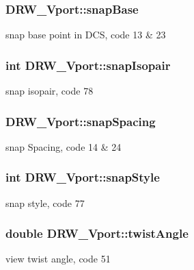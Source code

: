 \subsubsection[{snap\+Base}]{ D\+R\+W\+\_\+\+Vport\+::snap\+Base}\label{class_d_r_w___vport_a152be2cc28b499c29e9302efa54e001c}
snap base point in D\+C\+S, code 13 \& 23 \hypertarget{class_d_r_w___vport_ab69959b8dfaf2ce024b4babee4466445}{}
\subsubsection[{snap\+Isopair}]{\setlength{\rightskip}{0pt plus 5cm}int D\+R\+W\+\_\+\+Vport\+::snap\+Isopair}\label{class_d_r_w___vport_ab69959b8dfaf2ce024b4babee4466445}
snap isopair, code 78 \hypertarget{class_d_r_w___vport_a19aa53d1282cb737b21fa3d3b60d3b20}{}
\subsubsection[{snap\+Spacing}]{ D\+R\+W\+\_\+\+Vport\+::snap\+Spacing}\label{class_d_r_w___vport_a19aa53d1282cb737b21fa3d3b60d3b20}
snap Spacing, code 14 \& 24 \hypertarget{class_d_r_w___vport_a09eede75fea3bb3052edfc9caf5fd380}{}
\subsubsection[{snap\+Style}]{\setlength{\rightskip}{0pt plus 5cm}int D\+R\+W\+\_\+\+Vport\+::snap\+Style}\label{class_d_r_w___vport_a09eede75fea3bb3052edfc9caf5fd380}
snap style, code 77 \hypertarget{class_d_r_w___vport_a2705ee0b61e21b33cad269b71c04b86c}{}
\subsubsection[{twist\+Angle}]{\setlength{\rightskip}{0pt plus 5cm}double D\+R\+W\+\_\+\+Vport\+::twist\+Angle}\label{class_d_r_w___vport_a2705ee0b61e21b33cad269b71c04b86c}
view twist angle, code 51 \hypertarget{class_d_r_w___vport_ac3bd19802da31bd4bb9e07255e0bbdc6}{}

